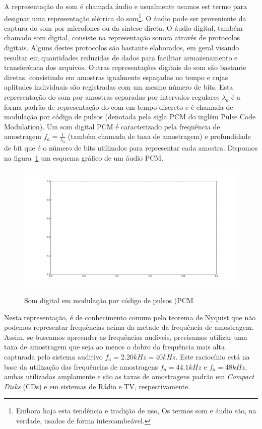 A representação do som é chamada áudio e usualmente usamos est termo para designar uma representação elétrica do som\footnote{Embora haja esta tendência e tradição de uso, Os termos
som e áudio são, na verdade, usados de forma intercambeável.}. O áudio pode ser proveniente da captura do som por microfones ou da síntese direta. O áudio digital, também chamado som digital, consiste na representação sonora através de protocolos digitais. Alguns destes protocolos são bastante elaborados, em geral visando resultar em quantidades reduzidas de dados para facilitar armazenamento e transferência dos arquivos. Outras representações digitais do som são bastante diretas, consistindo em amostras igualmente espaçadas no tempo e cujas aplitudes individuais são registradas com um mesmo número de bits. Esta representação do som por amostras separadas por intervalos regulares $\lambda_a$ é a forma padrão de representação do com em tempo discreto e é chamada de modulação por código de pulsos (denotada pela sigla PCM do inglêm Pulse Code Modulation).
Um som digital PCM é caracterizado pela frequência de amostragem $f_a=\frac{1}{\lambda_a}$ (também chamada de taxa de amostragem) e profundidade de bit que é o número de bits utilizados para representar cada amostra. Dispomos na figura~\ref{fig:PCM} um esquema gráfico de um áudio PCM.


\begin{figure}[h!]
    \centering
    \caption{Som digital em modulação por código de pulsos (PCM}
        \includegraphics[width=\textwidth]{figuras/foo}
        \label{fig:PCM}
\end{figure}

Nesta representação, é de conhecimento comum pelo teorema de Nyquist que não podemos representar frequências acima da metade da frequência de amostragem. Assim, se buscamos apreender as frequências audíveis, precisamos utilizar uma taxa de amostragem que seja ao menos o dobro da frequência mais alta capturada pelo sistema auditivo $f_a=2.20kHz=40kHz$. Este raciocínio está na base da utilização das frequências de amostragens $f_a=44.1kHz$ e $f_a=48kHz$, ambas utilizadas amplamente e são as taxas de amostragens padrão em \emph{Compact Disks} (CDs) e em sistemas de Rádio e TV, respectivamente.

